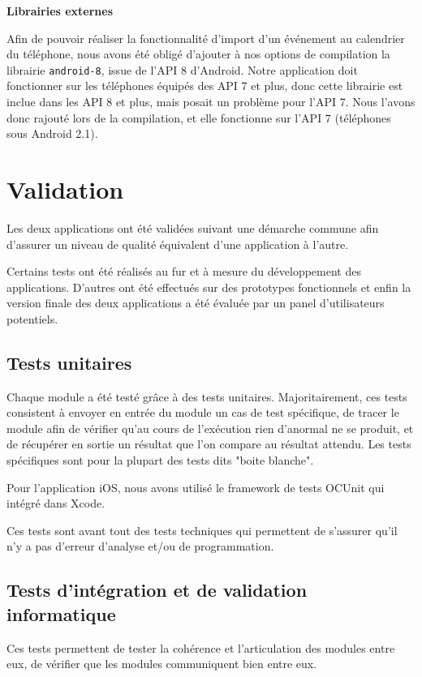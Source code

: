 \documentclass[a4paper, 11pt]{article}
\begin{document}
{\bf Librairies externes}

Afin de pouvoir réaliser la fonctionnalité d'import d'un événement au calendrier du téléphone, nous avons été obligé d'ajouter à nos options de compilation la librairie \texttt{android-8}, issue de l'API 8 d'Android. Notre application doit fonctionner sur les téléphones équipés des API 7 et plus, donc cette librairie est inclue dans les API 8 et plus, mais posait un problème pour l'API 7. Nous l'avons donc rajouté lors de la compilation, et elle fonctionne sur l'API 7 (téléphones sous Android 2.1).


\section{Validation}
Les deux applications ont été validées suivant une démarche commune afin d'assurer un niveau de qualité équivalent d'une application à l'autre.

Certains tests ont été réalisés au fur et à mesure du développement des applications. D'autres ont été effectués sur des prototypes fonctionnels et enfin la version finale des deux applications a été évaluée par un panel d'utilisateurs potentiels.

\subsection{Tests unitaires}
Chaque module a été testé grâce à des tests unitaires. Majoritairement, ces tests consistent à envoyer en entrée du module un cas de test spécifique, de tracer le module afin de vérifier qu'au cours de l'exécution rien d'anormal ne se produit, et de récupérer en sortie un résultat que l'on compare au résultat attendu. Les tests spécifiques sont pour la plupart des tests dits "boite blanche".

Pour l'application iOS, nous avons utilisé le framework de tests OCUnit qui intégré dans Xcode. 

Ces tests sont avant tout des tests techniques qui permettent de s'assurer qu'il n'y a pas d'erreur d'analyse et/ou de programmation.

\subsection{Tests d'intégration et de validation informatique}
Ces tests permettent de tester la cohérence et l'articulation des modules entre eux, de vérifier que les modules communiquent bien entre eux.
\end{document}

